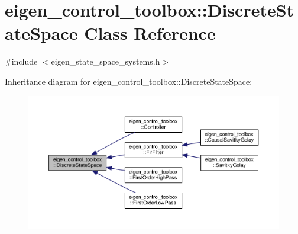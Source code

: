 \hypertarget{classeigen__control__toolbox_1_1_discrete_state_space}{}\section{eigen\+\_\+control\+\_\+toolbox\+:\+:Discrete\+State\+Space Class Reference}
\label{classeigen__control__toolbox_1_1_discrete_state_space}


{\ttfamily \#include $<$eigen\+\_\+state\+\_\+space\+\_\+systems.\+h$>$}



Inheritance diagram for eigen\+\_\+control\+\_\+toolbox\+:\+:Discrete\+State\+Space\+:
\nopagebreak
\begin{figure}[H]
\begin{center}
\leavevmode
\includegraphics[width=350pt]{classeigen__control__toolbox_1_1_discrete_state_space__inherit__graph}
\end{center}
\end{figure}
